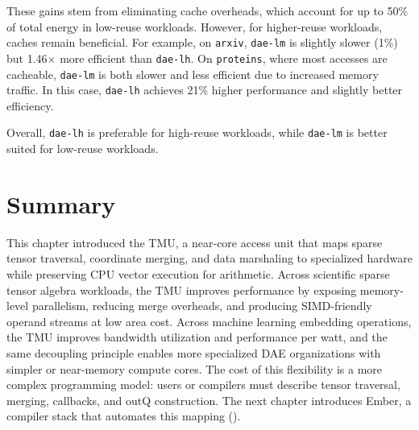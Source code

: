 These gains stem from eliminating cache overheads, which account for up to 50\% of total energy in low-reuse workloads. However, for higher-reuse workloads, caches remain beneficial. For example, on \texttt{arxiv}, \texttt{dae-lm} is slightly slower (1\%) but 1.46$\times$ more efficient than \texttt{dae-lh}. On \texttt{proteins}, where most accesses are cacheable, \texttt{dae-lm} is both slower and less efficient due to increased memory traffic. In this case, \texttt{dae-lh} achieves 21\% higher performance and slightly better efficiency.

Overall, \texttt{dae-lh} is preferable for high-reuse workloads, while \texttt{dae-lm} is better suited for low-reuse workloads.

\section{Summary} \label{sec:tmu-summary}

This chapter introduced the TMU, a near-core access unit that maps sparse tensor traversal, coordinate merging, and data marshaling to specialized hardware while preserving CPU vector execution for arithmetic. Across scientific sparse tensor algebra workloads, the TMU improves performance by exposing memory-level parallelism, reducing merge overheads, and producing SIMD-friendly operand streams at low area cost. Across machine learning embedding operations, the TMU improves bandwidth utilization and performance per watt, and the same decoupling principle enables more specialized DAE organizations with simpler or near-memory compute cores. The cost of this flexibility is a more complex programming model: users or compilers must describe tensor traversal, merging, callbacks, and outQ construction. The next chapter introduces Ember, a compiler stack that automates this mapping ().
